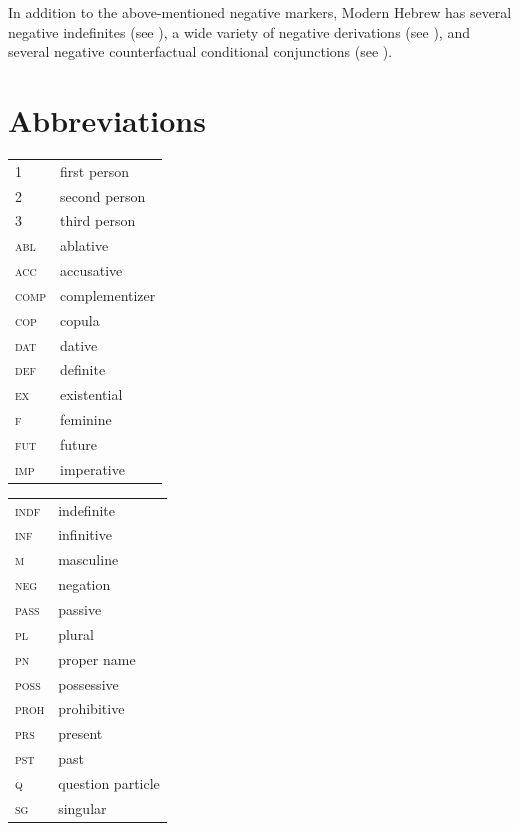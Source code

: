 \documentclass[output=paper,colorlinks,citecolor=brown]{langscibook}
\begin{document}
In addition to the above-mentioned negative markers, Modern Hebrew has several negative indefinites (see ), a wide variety of negative derivations (see ), and several negative counterfactual conditional conjunctions (see ).

 

\section*{Abbreviations}
\largerpage[1.5]
\begin{tabularx}{.45\textwidth}{lQ}
{\scshape 1} & first person\\
{\scshape 2} & second person\\
{\scshape 3} & third person\\
{\scshape abl} & ablative\\
{\scshape acc} & accusative\\
{\scshape comp} & complementizer\\
{\scshape cop} & copula\\
{\scshape dat} & dative\\
{\scshape def} & definite\\
{\scshape ex} & existential\\
{\scshape f} & feminine\\
{\scshape fut} & future\\
{\scshape imp} & imperative\\
\end{tabularx}
\begin{tabularx}{.45\textwidth}{lQ}
{\scshape indf} & indefinite\\
{\scshape inf}  & infinitive\\
{\scshape m} & masculine\\
{\scshape neg} & negation\\
{\scshape pass} & passive\\
{\scshape pl} & plural\\
{\scshape pn} & proper name\\
{\scshape poss} & possessive\\
{\scshape proh} & prohibitive\\
{\scshape prs} & present\\
{\scshape pst} & past\\
{\scshape q} & question particle\\
{\scshape sg} & singular\\
\end{tabularx}

\newpage
\sloppy\printbibliography[heading=subbibliography,notkeyword=this]
\end{document}
